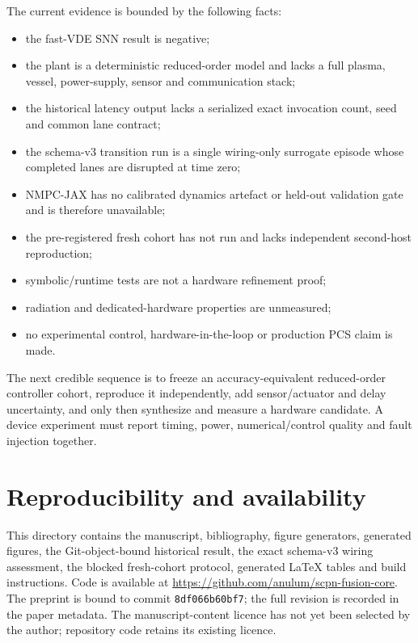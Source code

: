 \documentclass[11pt]{article}
\newcommand{\code}[1]{\texttt{#1}}
\begin{document}
The current evidence is bounded by the following facts:
\begin{itemize}
  \item the fast-VDE SNN result is negative;
  \item the plant is a deterministic reduced-order model and lacks a full
        plasma, vessel, power-supply, sensor and communication stack;
  \item the historical latency output lacks a serialized exact invocation
        count, seed and common lane contract;
  \item the schema-v3 transition run is a single wiring-only surrogate episode
        whose completed lanes are disrupted at time zero;
  \item NMPC-JAX has no calibrated dynamics artefact or held-out validation
        gate and is therefore unavailable;
  \item the pre-registered fresh cohort has not run and lacks independent
        second-host reproduction;
  \item symbolic/runtime tests are not a hardware refinement proof;
  \item radiation and dedicated-hardware properties are unmeasured;
  \item no experimental control, hardware-in-the-loop or production PCS claim
        is made.
\end{itemize}

The next credible sequence is to freeze an accuracy-equivalent reduced-order
controller cohort, reproduce it independently, add sensor/actuator and delay
uncertainty, and only then synthesize and measure a hardware candidate.  A
device experiment must report timing, power, numerical/control quality and fault
injection together.

\section{Reproducibility and availability}

This directory contains the manuscript, bibliography, figure generators,
generated figures, the Git-object-bound historical result, the exact schema-v3
wiring assessment, the blocked fresh-cohort protocol, generated LaTeX tables
and build instructions.  Code is available at
\url{https://github.com/anulum/scpn-fusion-core}.  The preprint is bound to
commit \code{8df066b60bf7}; the full revision is recorded in the paper metadata.  The
manuscript-content licence has not yet been selected by the author; repository
code retains its existing licence.
\end{document}
